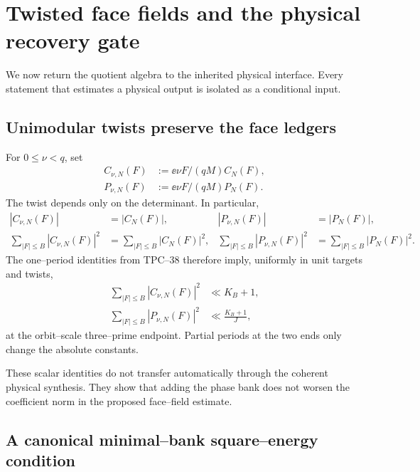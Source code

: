\section{Twisted face fields and the physical recovery gate}
\label{sec:tpc39-physical-gate}

We now return the quotient algebra to the inherited physical interface.
Every statement that estimates a physical output is isolated as a
conditional input.

\subsection{Unimodular twists preserve the face ledgers}

For \(0\le\nu<q\), set
\begin{align}
 C_{\nu,N}(F)
 &:=\ee{\nu F/(qM)}C_N(F),
 \label{eq:tpc39-twisted-C-field}\\
 P_{\nu,N}(F)
 &:=\ee{\nu F/(qM)}P_N(F).
 \label{eq:tpc39-twisted-P-field}
\end{align}
The twist depends only on the determinant.  In particular,
\begin{align}
 |C_{\nu,N}(F)|&=|C_N(F)|,
 &|P_{\nu,N}(F)|&=|P_N(F)|,
 \label{eq:tpc39-twist-preserves-pointwise-mass}\\
 \sum_{|F|\le B}|C_{\nu,N}(F)|^2
 &=\sum_{|F|\le B}|C_N(F)|^2,
 &
 \sum_{|F|\le B}|P_{\nu,N}(F)|^2
 &=\sum_{|F|\le B}|P_N(F)|^2.
 \label{eq:tpc39-twist-preserves-field-mass}
\end{align}
The one--period identities from TPC--38 therefore imply, uniformly in
unit targets and twists,
\begin{align}
 \sum_{|F|\le B}|C_{\nu,N}(F)|^2
 &\ll K_B+1,
 \label{eq:tpc39-full-window-mass}\\
 \sum_{|F|\le B}|P_{\nu,N}(F)|^2
 &\ll \frac{K_B+1}{J},
 \label{eq:tpc39-proper-window-mass}
\end{align}
at the orbit--scale three--prime endpoint.  Partial periods at the two
ends only change the absolute constants.

These scalar identities do not transfer automatically through the
coherent physical synthesis.  They show that adding the phase bank does
not worsen the coefficient norm in the proposed face--field estimate.

\subsection{A canonical minimal--bank square--energy condition}

